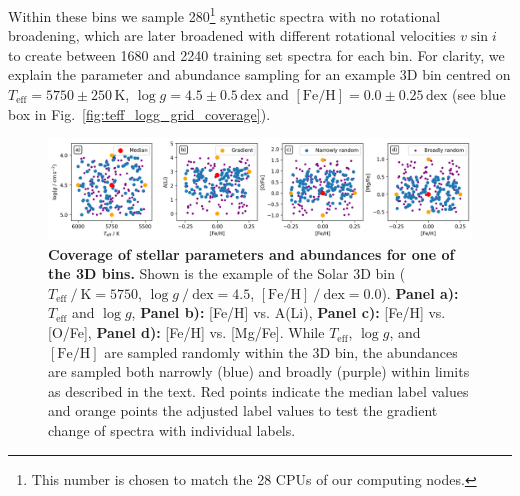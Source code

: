 \documentclass[
  journal=pasa,
  manuscript=research-paper, %
  year=2024,
  volume=37
]{cup-journal}
\newcommand{\Teff}{$T_\mathrm{eff}$\xspace}
\newcommand{\logg}{$\log g$\xspace}
\newcommand{\feh}{$\mathrm{[Fe/H]}$\xspace}
\newcommand{\vsini}{$v \sin i$\xspace}
\newcommand{\dex}{\,\mathrm{dex}}	%
\newcommand{\K}{\,\mathrm{K}}	%
\begin{document}
Within these bins we sample 280\footnote{This number is chosen to match the 28 CPUs of our computing nodes.} synthetic spectra with no rotational broadening, which are later broadened with different rotational velocities \vsini to create between 1680 and 2240 training set spectra for each bin. For clarity, we explain the parameter and abundance sampling for an example 3D bin centred on $T_\text{eff} = 5750\pm250\K$, $\log g = 4.5\pm0.5\dex$ and $\mathrm{[Fe/H]} = 0.0\pm0.25\dex$ (see blue box in Fig.~\ref{fig:teff_logg_grid_coverage}).

\begin{figure}[ht]
 \centering
 \includegraphics[width=\textwidth]{figures/example_3d_bin_sample.png}
 \caption{\textbf{Coverage of stellar parameters and abundances for one of the 3D bins.} Shown is the example of the Solar 3D bin ($T_\mathrm{eff}~/~\mathrm{K} = 5750$, $\log g~/~\mathrm{dex} = 4.5$, $\mathrm{[Fe/H]}~/~\mathrm{dex} = 0.0$). \textbf{Panel a):} \Teff and \logg, \textbf{Panel b):} [Fe/H] vs. A(Li), \textbf{Panel c):} [Fe/H] vs. [O/Fe], \textbf{Panel d):} [Fe/H] vs. [Mg/Fe]. While \Teff, \logg, and \feh are sampled randomly within the 3D bin, the abundances are sampled both narrowly (blue) and broadly (purple) within limits as described in the text. Red points indicate the median label values and orange points the adjusted label values to test the gradient change of spectra with individual labels.}
 \label{fig:example_3d_bin_sample}
\end{figure}
\end{document}
